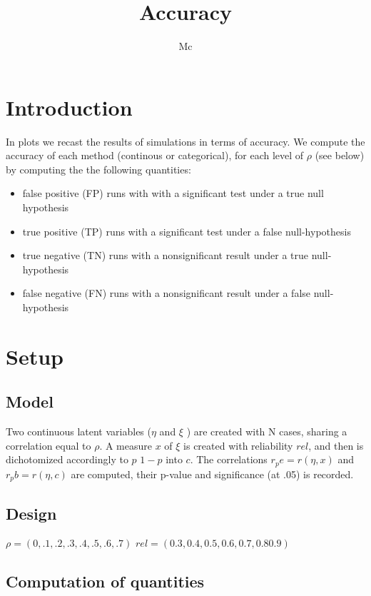 \documentclass{article}
\begin{document}


\title{Accuracy}

\author{Mc}
\maketitle
\section*{Introduction}
In plots we recast the results of simulations in terms of accuracy. We compute the accuracy of each method (continous or categorical), for each level of \(\rho\) (see below) by computing the  the following quantities:
\begin{itemize}
  \item false positive (FP)  runs with  with a significant test under a true null hypothesis
  \item true positive (TP) runs with a significant test under a false null-hypothesis 
  \item true negative (TN) runs  with a nonsignificant result under a true null-hypothesis
  \item false negative (FN) runs with a nonsignificant result under a false null-hypothesis

\end{itemize}

\section*{Setup}
\subsection*{Model}
Two continuous latent variables (\(\eta\) and \(\xi\) ) are created with N cases, sharing a correlation equal to \(\rho\). A measure \(x\) of \(\xi\) is created with reliability \(rel\), and then  is dichotomized accordingly to \(p\) \(1-p\) into \(c\). The correlations \( r_pe=r(\eta,x) \)  and \( r_pb=r(\eta,c) \) are computed, their p-value and significance (at .05) is recorded.
\subsection*{Design}
\(\rho=(0,.1,.2,.3,.4,.5,.6,.7) \)
\(rel=(0.3, 0.4 ,0.5, 0.6, 0.7 ,0.8 0.9) \) 


\subsection*{Computation of quantities}
\end{document}

